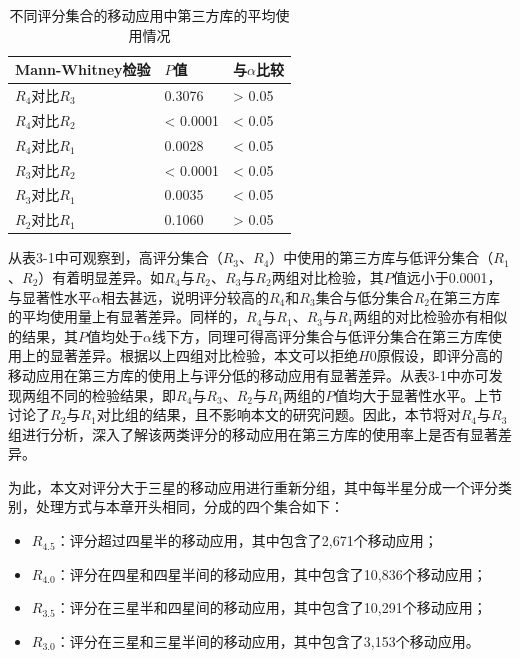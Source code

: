 \begin{table}
\centering
\caption{不同评分集合的移动应用中第三方库的平均使用情况}
\begin{tabular}{C{1.8in}C{1.2in}C{1in}}
\hline
\hline
Mann-Whitney检验 & $P$值 & 与$\alpha$比较 \\
\hline
$R_4$对比$R_3$ & 0.3076 & > 0.05 \\
$R_4$对比$R_2$ & < 0.0001 & < 0.05 \\
$R_4$对比$R_1$ & 0.0028 & < 0.05 \\
$R_3$对比$R_2$ & < 0.0001 & < 0.05 \\
$R_3$对比$R_1$ & 0.0035 & < 0.05 \\
$R_2$对比$R_1$ & 0.1060 & > 0.05 \\
\hline
\hline
\end{tabular}
\end{table}

从表3-1中可观察到，高评分集合（$R_3$、$R_4$）中使用的第三方库与低评分集合（$R_1$、$R_2$）有着明显差异。如$R_4$与$R_2$、$R_3$与$R_2$两组对比检验，其$P$值远小于0.0001，与显著性水平$\alpha$相去甚远，说明评分较高的$R_4$和$R_3$集合与低分集合$R_2$在第三方库的平均使用量上有显著差异。同样的，$R_4$与$R_1$、$R_3$与$R_1$两组的对比检验亦有相似的结果，其$P$值均处于$\alpha$线下方，同理可得高评分集合与低评分集合在第三方库使用上的显著差异。根据以上四组对比检验，本文可以拒绝$H0$原假设，即评分高的移动应用在第三方库的使用上与评分低的移动应用有显著差异。从表3-1中亦可发现两组不同的检验结果，即$R_4$与$R_3$、$R_2$与$R_1$两组的$P$值均大于显著性水平。上节讨论了$R_2$与$R_1$对比组的结果，且不影响本文的研究问题。因此，本节将对$R_4$与$R_3$组进行分析，深入了解该两类评分的移动应用在第三方库的使用率上是否有显著差异。

为此，本文对评分大于三星的移动应用进行重新分组，其中每半星分成一个评分类别，处理方式与本章开头相同，分成的四个集合如下：
\begin{itemize}
\item $R_{4.5}$：评分超过四星半的移动应用，其中包含了2,671个移动应用；
\item $R_{4.0}$：评分在四星和四星半间的移动应用，其中包含了10,836个移动应用；
\item $R_{3.5}$：评分在三星半和四星间的移动应用，其中包含了10,291个移动应用；
\item $R_{3.0}$：评分在三星和三星半间的移动应用，其中包含了3,153个移动应用。
\end{itemize}

